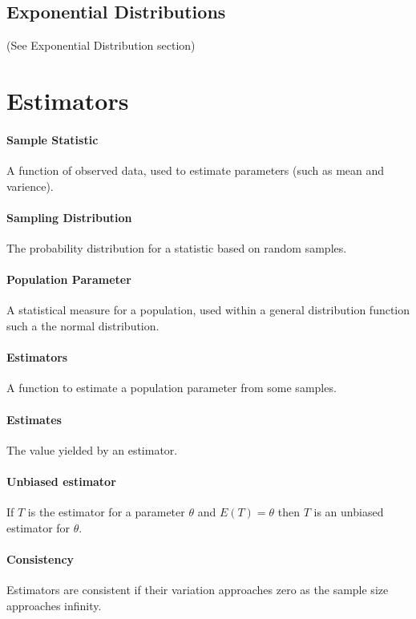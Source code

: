     \subsection{Exponential Distributions}
        (See Exponential Distribution section)

\section{Estimators}
    \paragraph{Sample Statistic} A function of observed data, used to estimate parameters (such as mean and varience).

    \paragraph{Sampling Distribution} The probability distribution for a statistic based on random samples.

    \paragraph{Population Parameter} A statistical measure for a population, used within a general distribution function such a the normal distribution.

    \paragraph{Estimators} A function to estimate a population parameter from some samples.

    \paragraph{Estimates} The value yielded by an estimator.

    \paragraph{Unbiased estimator} If $T$ is the estimator for a parameter $\theta$ and $E(T) = \theta$ then $T$ is an unbiased estimator for $\theta$.

    \paragraph{Consistency} Estimators are consistent if their variation approaches zero as the sample size approaches infinity.

